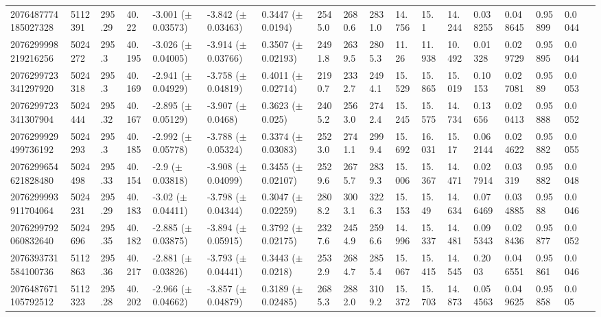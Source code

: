 \begin{sidewaystable}[htbp]
{\begin{tabular}{llllllllllllllllll}
            2076487774185027328 & 5112391 & 295.29 & 40.22 & -3.001 ($\pm$ 0.03573) & -3.842 ($\pm$ 0.03463) & 0.3447 ($\pm$ 0.0194) & 2545.0 & 2680.6 & 2831.0 & 14.756 & 15.1 & 14.244 & 0.038255 & 0.048645 & 0.95899 & 0.0044 & \\
            2076299998219216256 & 5024272 & 295.3 & 40.195 & -3.026 ($\pm$ 0.04005) & -3.914 ($\pm$ 0.03766) & 0.3507 ($\pm$ 0.02193) & 2491.8 & 2639.5 & 2805.3 & 11.26 & 11.938 & 10.492 & 0.01328 & 0.029729 & 0.95895 & 0.0044 & \\
            2076299723341297920 & 5024318 & 295.3 & 40.169 & -2.941 ($\pm$ 0.04929) & -3.758 ($\pm$ 0.04819) & 0.4011 ($\pm$ 0.02714) & 2190.7 & 2332.7 & 2494.1 & 15.529 & 15.865 & 15.019 & 0.10153 & 0.027081 & 0.9589 & 0.0053 & \\
            2076299723341307904 & 5024444 & 295.32 & 40.167 & -2.895 ($\pm$ 0.05129) & -3.907 ($\pm$ 0.0468) & 0.3623 ($\pm$ 0.025) & 2405.2 & 2563.0 & 2742.4 & 15.245 & 15.575 & 14.734 & 0.13656 & 0.020413 & 0.95888 & 0.0052 & \\
            2076299929499736192 & 5024293 & 295.3 & 40.185 & -2.992 ($\pm$ 0.05778) & -3.788 ($\pm$ 0.05324) & 0.3374 ($\pm$ 0.03083) & 2523.0 & 2741.1 & 2999.4 & 15.692 & 16.031 & 15.17 & 0.062144 & 0.024622 & 0.95882 & 0.0055 & \\
            2076299654621828480 & 5024498 & 295.33 & 40.154 & -2.9 ($\pm$ 0.03818) & -3.908 ($\pm$ 0.04099) & 0.3455 ($\pm$ 0.02107) & 2529.6 & 2675.7 & 2839.3 & 15.006 & 15.367 & 14.471 & 0.027914 & 0.03319 & 0.95882 & 0.0048 & \\
            2076299993911704064 & 5024231 & 295.29 & 40.183 & -3.02 ($\pm$ 0.04411) & -3.798 ($\pm$ 0.04344) & 0.3047 ($\pm$ 0.02259) & 2808.2 & 3003.1 & 3226.3 & 15.153 & 15.49 & 14.634 & 0.076469 & 0.034885 & 0.9588 & 0.0046 & \\
            2076299792060832640 & 5024696 & 295.35 & 40.182 & -2.885 ($\pm$ 0.03875) & -3.894 ($\pm$ 0.05915) & 0.3792 ($\pm$ 0.02175) & 2327.6 & 2454.9 & 2596.6 & 14.996 & 15.337 & 14.481 & 0.095343 & 0.028436 & 0.95877 & 0.0052 & \\
            2076393731584100736 & 5112863 & 295.36 & 40.217 & -2.881 ($\pm$ 0.03826) & -3.793 ($\pm$ 0.04441) & 0.3443 ($\pm$ 0.0218) & 2532.9 & 2684.7 & 2855.4 & 15.067 & 15.415 & 14.545 & 0.2003 & 0.046551 & 0.95861 & 0.0046 & \\
            2076487671105792512 & 5112323 & 295.28 & 40.202 & -2.966 ($\pm$ 0.04662) & -3.857 ($\pm$ 0.04879) & 0.3189 ($\pm$ 0.02485) & 2685.3 & 2882.0 & 3109.2 & 15.372 & 15.703 & 14.873 & 0.054563 & 0.049625 & 0.95858 & 0.005 & \\

\end{tabular}}
\end{sidewaystable}
